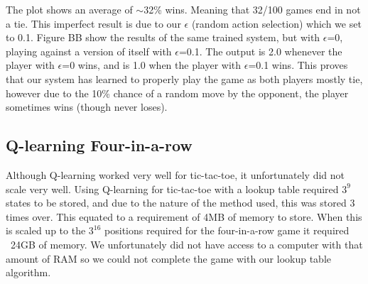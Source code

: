\documentclass[12pt,a4paper]{article}
\begin{document}
The plot shows an average of $\sim$32\% wins. Meaning that 32/100 games end in not a tie. This imperfect result is due to our $\epsilon$ (random action selection) which we set to 0.1. Figure BB show the results of the same trained system, but with $\epsilon$=0, playing against a version of itself with $\epsilon$=0.1.
The output is 2.0 whenever the player with $\epsilon$=0 wins, and is 1.0 when the player with $\epsilon$=0.1 wins. This proves that our system has learned to properly play the game as both players mostly tie, however due to the 10\% chance of a random move by the opponent, the player sometimes wins (though never loses).
\subsection*{Q-learning Four-in-a-row}
Although Q-learning worked very well for tic-tac-toe, it unfortunately did not scale very well. Using Q-learning for tic-tac-toe with a lookup table required $3^{9}$ states to be stored, and due to the nature of the method used, this was stored 3 times over. This equated to a requirement of 4MB of memory to store. When this is scaled up to the $3^{16}$ positions required for the four-in-a-row game it required ~24GB of memory. We unfortunately did not have access to a computer with that amount of RAM so we could not complete the game with our lookup table algorithm.
\end{document}
